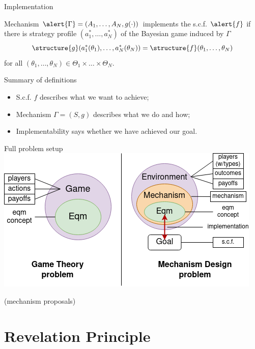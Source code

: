 \documentclass[english,10pt
,aspectratio=169
]{beamer}
\begin{document}
\begin{frame}{Implementation}
	\begin{definition}[implementation]
		Mechanism $\alert{\Gamma}=(A_{1},\dots,A_{N},g(\cdot))$ \alert{implements} the s.c.f. $\alert{f}$ if there is  strategy profile $(a_{1}^{*},\dots,a_{N}^{*})$ of the Bayesian game induced by $\Gamma$  
		$$\structure{g}(a_{1}^{*}(\theta_{1}),\dots,a_{N}^{*}(\theta_{N})) = \structure{f} (\theta_{1},\dots,\theta_{N})$$ 
		for all $(\theta_{1},\dots,\theta_{N})\in\Theta_{1}\times\dots \times\Theta_{N}$.
	\end{definition}
\end{frame}


\begin{frame}{Summary of definitions}
	\begin{itemize}
		\item S.c.f. $f$ describes what we want to achieve;
		\item Mechanism $\Gamma = (S,g)$ describes what we do and how;
		\item Implementability says whether we have achieved our goal.
	\end{itemize}
\end{frame}


\begin{frame}{Full problem setup}
	\centering
	\includegraphics[scale=0.7]{pics/M1/game_vs_mech2}
\end{frame}


\begin{frame}
	(mechanism proposals)
\end{frame}



\section{Revelation Principle}
\end{document}
